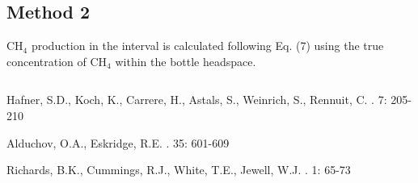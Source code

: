 \documentclass[]{article}
\begin{document}
\subsection{Method 2}
CH$_4$  production in the interval is calculated following Eq. (7) using the true concentration of CH$_4$ within the bottle headspace.

\begin{equation*}
\end{equation*}

\begin{thebibliography}{1}

Hafner, S.D., Koch, K., Carrere, H., Astals, S., Weinrich, S., Rennuit, C.
    . 
     7: 205-210

Alduchov, O.A., Eskridge, R.E.    
    . 
     35: 601-609

Richards, B.K., Cummings, R.J., White, T.E., Jewell, W.J.    
    . 
     1: 65-73

\end{thebibliography}


%
\end{document}
